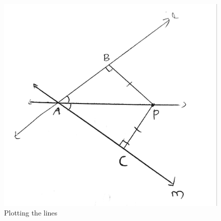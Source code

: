 \documentclass[journal,12pt,twocolumn]{IEEEtran}
\begin{document}
\begin{figure}[!ht]
\centering
\includegraphics[width=\columnwidth]{Assignment3.jpg}
\caption{Plotting the lines}
\end{figure}
\end{document}
